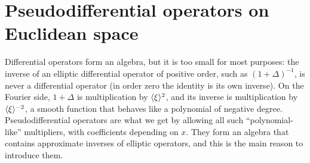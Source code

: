 \chapter{Pseudodifferential operators on Euclidean space}\label{ch:euclidean}
\providecommand{\Amp}[2]{\mathcal{A}^{#1}_{#2}}%
\usetikzlibrary{patterns}

Differential operators form an algebra, but it is too small for most purposes: the
inverse of an elliptic differential operator of positive order, such as
$(1+\Delta)^{-1}$, is never a differential operator (in order zero the identity is
its own inverse). On the Fourier side, $1+\Delta$ is multiplication by
$\langle \xi\rangle^2$, and its inverse is multiplication by $\langle \xi\rangle^{-2}$, a smooth function
that behaves like a polynomial of negative degree. Pseudodifferential operators are
what we get by allowing all such ``polynomial-like'' multipliers, with coefficients
depending on $x$. They form an algebra that contains approximate inverses of elliptic
operators, and this is the main reason to introduce them.

